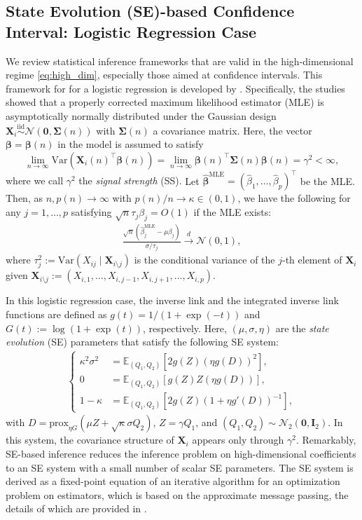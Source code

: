 \documentclass[12pt,reqno]{amsart}
\newcommand{\rbr}[1]{\left(#1\right)}
\newcommand{\sbr}[1]{\left[#1\right]}
\newcommand{\iid}{\overset{\mathrm{iid}}{\sim}}
\newcommand{\cc}{\color{black}}
\renewcommand{\hat}{\widehat}
\def\bzero{\bm{0}}
\def\bI{\bm{I}}
\def\bX{\bm{X}}
\def\bbeta{\bm{\beta}}
\def\bSigma{\bm{\Sigma}}
\begin{document}
\subsection{State Evolution (SE)-based Confidence Interval: Logistic Regression Case}\label{sec:surcandes}

We review statistical inference frameworks that are valid in the high-dimensional regime \eqref{eq:high_dim}, especially those aimed at confidence intervals.
This framework for for a logistic regression is developed by \cite{sur2019modern,zhao2022asymptotic}. 
Specifically, the studies showed that a properly corrected maximum likelihood estimator (MLE) is asymptotically normally distributed {\cc under the Gaussian design $\bX_i\iid\mathcal{N}(\bzero,\bSigma(n))$ with $\bSigma(n)$ a covariance matrix}.
{\cc Here, the vector $\bbeta=\bbeta(n)$ in the model is assumed to satisfy 
\[\lim_{n\to\infty}\mathrm{Var}(\bX_i(n)^\top\bbeta(n))=\lim_{n\to\infty}\bbeta(n)^\top\bSigma(n)\bbeta(n)=\gamma^2<\infty,\]
where we call $\gamma^2$ the \textit{signal strength} (SS).}
Let $\hat{\bbeta}^{\mathrm{MLE}} = (\hat{\beta}_1,\dots,\hat{\beta}_p)^\top$ be the MLE.
Then, as $n,p(n)\to\infty$ with $p(n)/n\to\kappa\in(0,1)$, we have the following for any $j=1,\dots,p$ satisfying $\sqrt{n}\tau_j\beta_j=O(1)$ if the MLE exists:
\begin{align}
    \frac{\sqrt{n}(\hat{\beta}_j^\mathrm{MLE}-\mu\beta_j)}{\sigma { /\tau_j}}\overset{d}{\to}\mathcal{N}(0,1), \label{def:asym_norm}
\end{align}
where $\tau_j^2:=\mathrm{Var}(X_{ij}\mid\bX_{i\setminus j} )$ is the conditional variance of the $j$-th element of $\bX_i$ given $\bX_{i\setminus j} := (X_{i,1},\dots,X_{i,j-1},X_{i,j+1},\dots,X_{i,p})$.

In this logistic regression case, the inverse link and the integrated inverse link functions are defined as $g(t) = 1/(1 + \exp(-t))$ and $G(t):= \log(1+\exp(t))$, respectively. Here, $(\mu, \sigma, \eta)$ are the \textit{state evolution} (SE) parameters 
that satisfy the following SE system: %
\begin{align}
\label{eq:SE-system-SC}
    \begin{cases}
        \kappa^2 \sigma^2 &= \mathbb{E}_{(Q_1,Q_2)} \sbr{2 g(Z) \rbr{\eta g(D)}^2},\\
        0 &= \mathbb{E}_{(Q_1,Q_2)} \sbr{g(Z) Z (\eta g(D))},\\
        1-\kappa &= \mathbb{E}_{(Q_1,Q_2)} \sbr{ 2 g(Z)( 1 + \eta g'(D))^{-1} },
    \end{cases}
\end{align}
with $D=\mathrm{prox}_{\eta G}\rbr{\mu Z +\sqrt{\kappa}\sigma Q_2}$, $Z=\gamma Q_1$, and $(Q_1,Q_2)\sim \mathcal{N}_2(\bzero,\bI_2)$. 
{
In this system, the covariance structure of $\bX_i$ appears only through $\gamma^2$.}
Remarkably, SE-based inference reduces the inference problem on high-dimensional coefficients to an SE system with a small number of scalar SE parameters. The SE system is derived as a fixed-point equation of an iterative algorithm for an optimization problem on estimators, 
which is based on the approximate message passing, the details of which are provided in \cite{feng2022unifying}.
\end{document}
